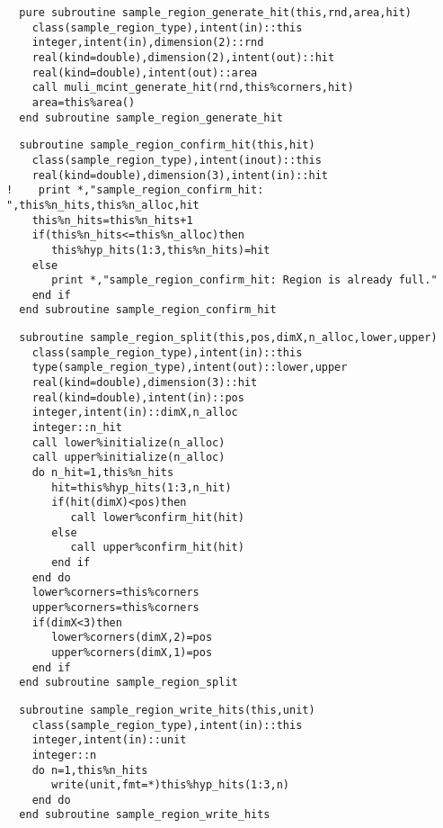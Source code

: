 \begin{Verbatim}
  pure subroutine sample_region_generate_hit(this,rnd,area,hit)
    class(sample_region_type),intent(in)::this
    integer,intent(in),dimension(2)::rnd
    real(kind=double),dimension(2),intent(out)::hit
    real(kind=double),intent(out)::area
    call muli_mcint_generate_hit(rnd,this%corners,hit)
    area=this%area()
  end subroutine sample_region_generate_hit
\end{Verbatim}

\begin{Verbatim}
  subroutine sample_region_confirm_hit(this,hit)
    class(sample_region_type),intent(inout)::this
    real(kind=double),dimension(3),intent(in)::hit
!    print *,"sample_region_confirm_hit: ",this%n_hits,this%n_alloc,hit
    this%n_hits=this%n_hits+1
    if(this%n_hits<=this%n_alloc)then
       this%hyp_hits(1:3,this%n_hits)=hit
    else
       print *,"sample_region_confirm_hit: Region is already full."
    end if
  end subroutine sample_region_confirm_hit
\end{Verbatim}
  
\begin{Verbatim}
  subroutine sample_region_split(this,pos,dimX,n_alloc,lower,upper)
    class(sample_region_type),intent(in)::this
    type(sample_region_type),intent(out)::lower,upper
    real(kind=double),dimension(3)::hit
    real(kind=double),intent(in)::pos
    integer,intent(in)::dimX,n_alloc
    integer::n_hit    
    call lower%initialize(n_alloc)
    call upper%initialize(n_alloc)
    do n_hit=1,this%n_hits
       hit=this%hyp_hits(1:3,n_hit)
       if(hit(dimX)<pos)then
          call lower%confirm_hit(hit)
       else
          call upper%confirm_hit(hit)
       end if
    end do
    lower%corners=this%corners
    upper%corners=this%corners
    if(dimX<3)then
       lower%corners(dimX,2)=pos
       upper%corners(dimX,1)=pos
    end if
  end subroutine sample_region_split
\end{Verbatim}

\begin{Verbatim}
  subroutine sample_region_write_hits(this,unit)
    class(sample_region_type),intent(in)::this
    integer,intent(in)::unit
    integer::n
    do n=1,this%n_hits
       write(unit,fmt=*)this%hyp_hits(1:3,n)
    end do
  end subroutine sample_region_write_hits
\end{Verbatim}

